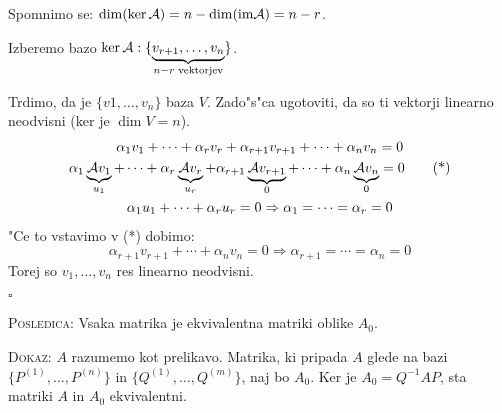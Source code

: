 Spomnimo se: $\dim (\ker \mathcal{A}) = n - \dim (\text{im} \mathcal{A}) = n - r$.

Izberemo bazo $\ker \mathcal{A}: \{\underbrace{v_{r+1}, \ldots, v_n}_{n-r \text{ vektorjev}}\}$.

Trdimo, da je $\{v1, \ldots, v_n\}$ baza $V$. Zado"s"ca ugotoviti, da so ti vektorji linearno neodvisni (ker je $\dim V = n$).
\begin{gather*}
\alpha_1 v_1 + \cdots + \alpha_r v_r + \alpha_{r+1} v_{r+1} + \cdots + \alpha_n v_n = 0 \\
\alpha_1 \underbrace{\mathcal{A} v_1}_{u_1} + \cdots + \alpha_r \underbrace{\mathcal{A} v_r}_{u_r} + \alpha_{r+1} \underbrace{\mathcal{A} v_{r+1}}_0 + \cdots + \alpha_n \underbrace{\mathcal{A} v_n}_0 = 0 \tag{*} \\
\alpha_1 u_1 + \cdots + \alpha_r u_r = 0 \Rightarrow \alpha_1 = \cdots = \alpha_r = 0
\end{gather*}
"Ce to vstavimo v (*) dobimo:
\begin{equation*}
\alpha_{r+1} v_{r+1} + \cdots + \alpha_n v_n = 0 \Rightarrow \alpha_{r+1}  = \cdots = \alpha_n = 0
\end{equation*}
Torej so $v_1, \ldots, v_n$ res linearno neodvisni.

\hfill $\square$

\textsc{Posledica:} Vsaka matrika je ekvivalentna matriki oblike $A_0$.

\textsc{Dokaz:} $A$ razumemo kot prelikavo. Matrika, ki pripada $A$ glede na bazi $\{P^{(1)}, \ldots, P^{(n)}\}$ in $\{Q^{(1)}, \ldots, Q^{(m)}\}$, naj bo $A_0$. Ker je $A_0 = Q^{-1} A P$, sta matriki $A$ in $A_0$ ekvivalentni.

